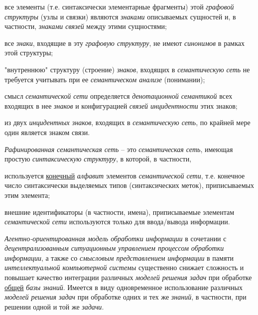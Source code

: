 \begin{textitemize}
	\item
	все элементы (т.е. синтаксически элементарные фрагменты) этой \textit{графовой структуры} (узлы и связки) являются \textit{знаками} описываемых сущностей и, в частности, \textit{знаками связей} между этими сущностями;
	\item
	все \textit{знаки}, входящие в эту \textit{графовую структуру}, не имеют \textit{синонимов} в рамках этой структуры;
	\item
	"внутреннюю"{} структуру (строение) \textit{знаков}, входящих в \textit{семантическую сеть} не требуется учитывать при ее \textit{семантическом анализе} (понимании);
	\item
	смысл \textit{семантической сети} определяется \textit{денотационной семантикой} всех входящих в нее \textit{знаков} и конфигурацией \textit{связей инцидентности} этих знаков;
	\item
	из двух \textit{инцидентных знаков}, входящих в \textit{семантическую сеть}, по крайней мере один является знаком связи.
\end{textitemize}

\textit{Рафинированная семантическая сеть} -- это \textit{семантическая сеть}, имеющая простую \textit{синтаксическую структуру}, в которой, в частности,

\begin{textitemize}
	\item
	используется \underline{конечный} \textit{алфавит} элементов \textit{семантической сети}, т.е. конечное число синтаксически выделяемых типов (синтаксических меток), приписываемых этим элемента;
	\item
	внешние идентификаторы (в частности, имена), приписываемые элементам \textit{семантической сети} используются только для ввода/вывода информации.
\end{textitemize}

\textit{Агентно-ориентированная модель обработки информации} в сочетании с \textit{децентрализованным ситуационным управлением процессом обработки информации}, а также со \textit{смысловым представлением информации} в памяти \textit{интеллектуальной компьютерной системы} существенно снижает сложность и повышает качество интеграции различных \textit{моделей решения задач} при обработке \underline{общей} \textit{базы знаний}. Имеется в виду одновременное использование различных \textit{моделей решения задач} при обработке одних и тех же \textit{знаний}, в частности, при решении одной и той же \textit{задачи}.

